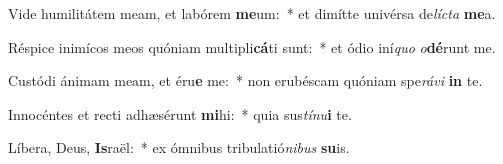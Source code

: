 \item Vide humilitátem meam, et labórem \textbf{me}um:~* et dimítte univérsa de\textit{líc}\textit{ta} \textbf{me}a.
\item Réspice inimícos meos quóniam multipli\textbf{cá}ti sunt:~* et ódio iní\textit{quo} \textit{o}\textbf{dé}runt me.
\item Custódi ánimam meam, et éru\textbf{e} me:~* non erubéscam quóniam spe\textit{rá}\textit{vi} \textbf{in} te.
\item Innocéntes et recti adhæsérunt \textbf{mi}hi:~* quia sus\textit{tí}\textit{nu}\textbf{i} te.
\item Líbera, Deus, \textbf{Is}raël:~* ex ómnibus tribulatió\textit{ni}\textit{bus} \textbf{su}is.
